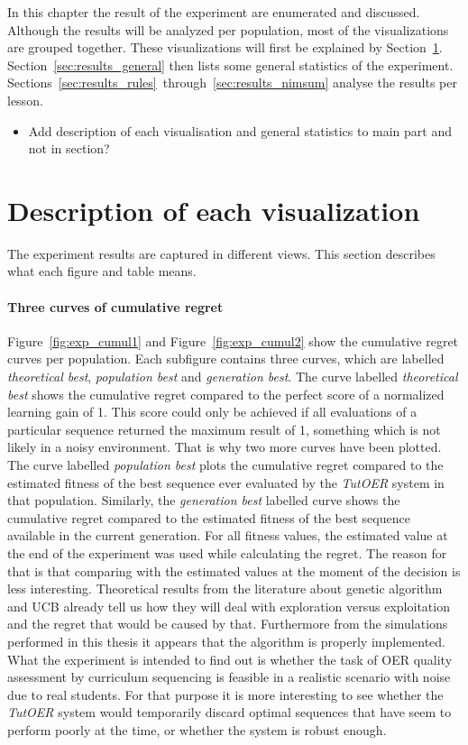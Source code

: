 In this chapter the result of the experiment are enumerated and discussed.
Although the results will be analyzed per population, most of the
visualizations are grouped together. These visualizations will first be
explained by Section~\ref{sec:results_explanation}.
Section~\ref{sec:results_general} then lists some general statistics of the
experiment.
Sections~\ref{sec:results_rules}~through~\ref{sec:results_nimsum}
analyse the results per lesson.

\begin{itemize}
	\item Add description of each visualisation and general statistics to main
		part and not in section?
\end{itemize}

\section{Description of each visualization}
\label{sec:results_explanation}
The experiment results are captured in different views. This section describes
what each figure and table means.
\paragraph{Three curves of cumulative regret}
Figure~\ref{fig:exp_cumul1} and Figure~\ref{fig:exp_cumul2} show the cumulative
regret curves per population. Each subfigure contains three curves, which are
labelled \emph{theoretical best}, \emph{population best} and \emph{generation
best}. The curve labelled \emph{theoretical best} shows the cumulative regret
compared to the perfect score of a normalized learning gain of 1. This score
could only be achieved if all evaluations of a particular sequence returned the
maximum result of 1, something which is not likely in a noisy environment. That
is why two more curves have been plotted. The curve labelled \emph{population
best} plots the cumulative regret compared to the estimated fitness of the best
sequence ever evaluated by the \emph{TutOER} system in that population.
Similarly, the \emph{generation best} labelled curve shows the cumulative
regret compared to the estimated fitness of the best sequence available in the
current generation. For all fitness values, the estimated value at the end of
the experiment was used while calculating the regret. The reason for that is
that comparing with the estimated values at the moment of the decision is less
interesting. Theoretical results from the literature about genetic
algorithm and UCB already tell us how they will deal with exploration versus
exploitation and the regret that would be caused by that. Furthermore from the
simulations performed in this thesis it appears that the algorithm is properly
implemented. What the experiment is intended to find out is whether the task of
OER quality assessment by curriculum sequencing is feasible in a realistic
scenario with noise due to real students. For that purpose it is more
interesting to see whether the \emph{TutOER} system would temporarily discard
optimal sequences that have seem to perform poorly at the time, or whether the
system is robust enough.
